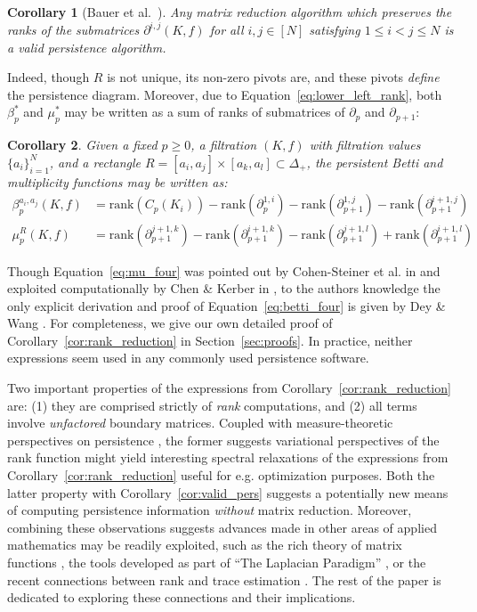 \documentclass[pdflatex,sn-mathphys-num]{sn-jnl}
\newtheorem{corollary}{Corollary}
\begin{document}
\begin{corollary}[Bauer et al.~\cite{bauer2022keeping}]
	Any matrix reduction algorithm which preserves the ranks of the submatrices $\partial^{i , j} (K , f)$ for all $i, j \in [N]$ satisfying $1 \leq i < j \leq N$ is a valid persistence algorithm.
\end{corollary}\label{cor:valid_pers}
\noindent Indeed, though \(R\) is not unique, its non-zero pivots are, and these pivots \emph{define} the persistence diagram. Moreover, due to Equation~\ref{eq:lower_left_rank}, both \(\beta_{p}^{\ast}\) and \(\mu_{p}^{\ast}\) may be written as a sum of ranks of submatrices of \(\partial_{p}\) and \(\partial_{p + 1}\):

\begin{corollary}
	Given a fixed $p \geq 0$, a filtration $(K , f)$ with filtration values $ \{ a_i \}_{i = 1}^N$, and a rectangle $R = [a_i , a_j] \times [a_k , a_l] \subset \Delta_+$, the persistent Betti and multiplicity functions may be written as:
	\begin{align}
	\beta_p^{a_i, a_j}(K, f) &= \mathrm{rank}(C_p (K_i)) - \mathrm{rank}(\partial_p^{1,i}) - \mathrm{rank}(\partial_{p+1}^{1,j}) - \mathrm{rank}(\partial_{p+1}^{i+1,j}) \label{eq:betti_four}\\
		\mu_p^R (K, f) &= \mathrm{rank}(\partial_{p+1}^{j+1, k}) - \mathrm{rank}(\partial_{p+1}^{i+1, k}) - \mathrm{rank}(\partial_{p+1}^{j+1, l}) + \mathrm{rank}(\partial_{p+1}^{i+1, l}) \label{eq:mu_four}
	\end{align}
\end{corollary}\label{cor:rank_reduction}
\noindent Though Equation~\ref{eq:mu_four} was pointed out by Cohen-Steiner et al. in \cite{cohen2006vines} and exploited computationally by Chen \& Kerber in \cite{chen2011output}, to the authors knowledge the only explicit derivation and proof of Equation~\ref{eq:betti_four} is given by Dey \& Wang \cite{dey2022computational}. For completeness, we give our own detailed proof of Corollary~\ref{cor:rank_reduction} in Section~\ref{sec:proofs}. In practice, neither expressions seem used in any commonly used persistence software.

Two important properties of the expressions from Corollary~\ref{cor:rank_reduction} are: (1) they are comprised strictly of \emph{rank} computations, and (2) all terms involve \emph{unfactored} boundary matrices. Coupled with measure-theoretic perspectives on persistence \cite{chazal2016structure}, the former suggests variational perspectives of the rank function might yield interesting spectral relaxations of the expressions from Corollary~\ref{cor:rank_reduction} useful for e.g. optimization purposes. Both the latter property with Corollary~\ref{cor:valid_pers} suggests a potentially new means of computing persistence information \emph{without} matrix reduction. Moreover, combining these observations suggests advances made in other areas of applied mathematics may be readily exploited, such as the rich theory of matrix functions \cite{bhatia2013matrix}, the tools developed as part of ``The Laplacian Paradigm'' \cite{teng2010laplacian}, or the recent connections between rank and trace estimation \cite{ubaru2016fast}. The rest of the paper is dedicated to exploring these connections and their implications.
\end{document}
